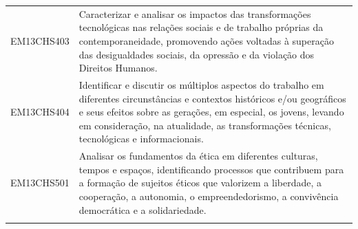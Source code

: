 \documentclass[12pt]{extarticle}
\begin{document}
\begin{longtable}{ll}
EM13CHS403 & Caracterizar e analisar os impactos das transformações tecnológicas nas relações sociais e de trabalho próprias da contemporaneidade, promovendo ações voltadas à superação das desigualdades sociais, da opressão e da violação dos Direitos Humanos.                                                                                                                                                                                                                                                                                                                                                                                                                                                                                                                                                                \\
\rowcolor[HTML]{FFF} 
EM13CHS404 & Identificar e discutir os múltiplos aspectos do trabalho em diferentes circunstâncias e contextos históricos e/ou geográficos e seus efeitos sobre as gerações, em especial, os jovens, levando em consideração, na atualidade, as transformações técnicas, tecnológicas e informacionais.                                                                                                                                                                                                                                                                                                                                                                                                                                                                                                                            \\
\rowcolor[HTML]{E0F7FA} 
EM13CHS501 & Analisar os fundamentos da ética em diferentes culturas, tempos e espaços, identificando processos que contribuem para a formação de sujeitos éticos que valorizem a liberdade, a cooperação, a autonomia, o empreendedorismo, a convivência democrática e a solidariedade.                                                                                                                                                                                                                                                                                                                                                                                                                                                                                                                                           \\
\rowcolor[HTML]{FFF} 

\end{longtable}
\end{document}
